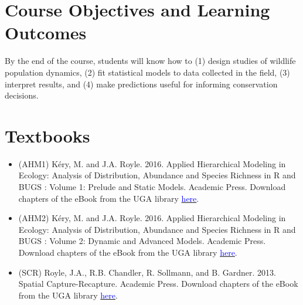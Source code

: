 \documentclass[12pt]{article}
\begin{document}
\vspace{-4mm}
\section*{\normalsize Course Objectives and Learning Outcomes}
\vspace{-4mm}
By the end of the course, students will know how to (1) design studies
of wildlife population dynamics, (2) fit statistical
models to data collected in the field, (3) interpret results, and (4)
make predictions useful for informing conservation decisions.  


\vspace{-4mm}
\section*{\normalsize Textbooks}
\vspace{-4mm}

\begin{itemize}
  \item (AHM1) K\'ery, M. and J.A. Royle. 2016. Applied Hierarchical Modeling
    in Ecology: Analysis of Distribution, Abundance and Species Richness
    in R and BUGS : Volume 1: Prelude and Static Models. Academic Press.
    Download chapters of the eBook from the UGA library
        \href{http://eds.b.ebscohost.com/eds/detail/detail?vid=1&sid=23324ccb-5b1f-4eb6-b8b7-005232b9b48f%40pdc-v-sessmgr05&bdata=JnNpdGU9ZWRzLWxpdmU%3d#AN=1098832&db=nlebk}{\textcolor{blue}{here}}.
  \item (AHM2) K\'ery, M. and J.A. Royle. 2016. Applied Hierarchical Modeling
    in Ecology: Analysis of Distribution, Abundance and Species Richness
    in R and BUGS : Volume 2: Dynamic and Advanced Models. Academic Press.
    Download chapters of the eBook from the UGA library
        \href{http://web.b.ebscohost.com.proxy-remote.galib.uga.edu/ehost/detail/detail?vid=0&sid=9b90211e-7b87-4282-bd69-037657b44cbf%40sessionmgr101&bdata=JnNpdGU9ZWhvc3QtbGl2ZQ%3d%3d#AN=1158640&db=nlebk}{\textcolor{blue}{here}}.
  \item (SCR) Royle, J.A., R.B. Chandler, R. Sollmann, and
    B. Gardner. 2013. Spatial Capture-Recapture. Academic Press.
    Download chapters of the eBook from the UGA library
        \href{http://eds.b.ebscohost.com/eds/detail/detail?vid=1&sid=44b8c9d7-8190-4990-8419-610cbd7b7fa9%40pdc-v-sessmgr01&bdata=JnNpdGU9ZWRzLWxpdmU%3d#AN=501310&db=nlebk}{\textcolor{blue}{here}}.
\end{itemize}
\end{document}
